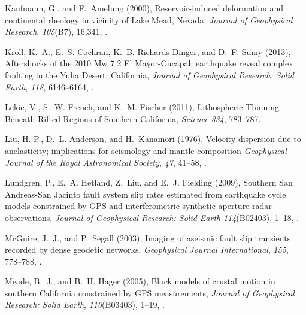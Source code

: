 \documentclass[draft,linenumbers]{AGUJournal}
\begin{document}
\begin{thebibliography}{52}
Kaufmann, G., and F.~Amelung (2000), {Reservoir-induced deformation and continental rheology in vicinity of Lake Mead, Nevada}, \textit{Journal of Geophysical Research}, \textit{105}(B7), 16,341, .

Kroll, K.~A., E.~S. Cochran, K.~B. Richards-Dinger, and D.~F. Sumy (2013), {Aftershocks of the 2010 Mw 7.2 El Mayor-Cucapah earthquake reveal complex faulting in the Yuha Desert, California}, \textit{Journal of Geophysical Research: Solid Earth}, \textit{118}, 6146--6164, .

Lekic, V., S.~W. French, and K.~M. Fischer (2011), {Lithospheric Thinning Beneath Rifted Regions of Southern California}, \textit{Science} \textit{334}, 783--787.

Liu, H.-P., D.~L. Anderson, and H.~Kanamori (1976), {Velocity dispersion due to anelasticity; implications for seismology and mantle composition} \textit{Geophysical Journal of the Royal Astronomical Society}, \textit{47}, 41--58, .

Lundgren, P., E.~A. Hetland, Z.~Liu, and E.~J. Fielding (2009), {Southern San Andreas-San Jacinto fault system slip rates estimated from earthquake cycle models constrained by GPS and interferometric synthetic aperture radar observations}, \textit{Journal of Geophysical Research: Solid Earth} \textit{114}(B02403), 1--18, .

McGuire, J.~J., and P.~Segall (2003), {Imaging of aseismic fault slip transients recorded by dense geodetic networks}, \textit{Geophysical Journal International}, \textit{155}, 778--788, .

Meade, B.~J., and B.~H. Hager (2005), {Block models of crustal motion in southern California constrained by GPS measurements}, \textit{Journal of Geophysical Research: Solid Earth}, \textit{110}(B03403), 1--19, .


\end{thebibliography}
\end{document}
